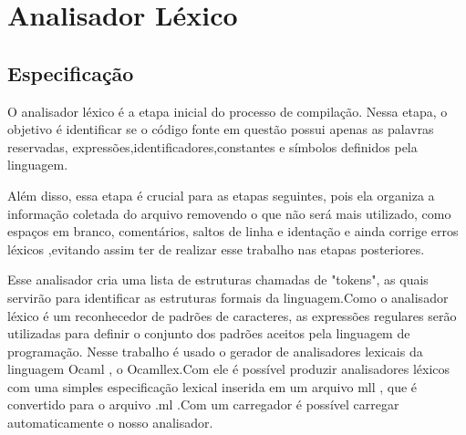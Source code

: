 \documentclass[12pt,a4paper,twoside]{report}
\begin{document}
\begin{terminal}
\end{terminal}


\chapter{Analisador Léxico}

\section{Especificação}

O analisador léxico é a etapa inicial do processo de compilação. Nessa etapa, o objetivo é identificar se o código fonte em questão possui apenas as palavras reservadas, expressões,identificadores,constantes e símbolos definidos pela linguagem.

Além disso, essa etapa é crucial para as etapas seguintes, pois ela organiza a informação coletada do arquivo removendo o que não será mais utilizado, como espaços em branco, comentários, saltos de linha e identação e ainda corrige erros léxicos ,evitando assim ter de realizar esse trabalho nas etapas posteriores. 

Esse analisador cria uma lista de estruturas chamadas de "tokens", as quais servirão para identificar as estruturas formais da linguagem.Como o analisador léxico é um reconhecedor de padrões de caracteres, as expressões regulares serão utilizadas para definir  o conjunto dos padrões aceitos pela linguagem de programação.
Nesse trabalho é usado o gerador de analisadores lexicais da linguagem Ocaml , o Ocamllex.Com ele é possível produzir analisadores léxicos com uma simples especificação lexical inserida em um arquivo mll , que é convertido para o arquivo .ml .Com um carregador é possível carregar automaticamente o nosso analisador.
\end{document}
